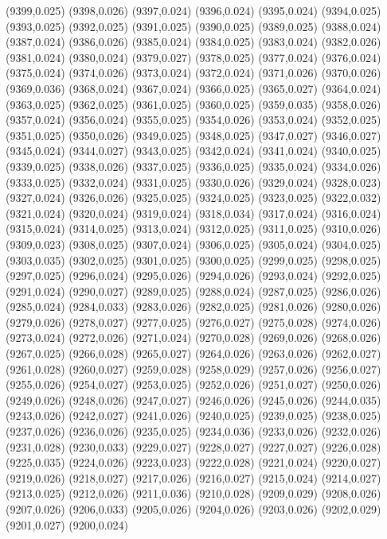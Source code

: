 (9399,0.025)
(9398,0.026)
(9397,0.024)
(9396,0.024)
(9395,0.024)
(9394,0.025)
(9393,0.025)
(9392,0.025)
(9391,0.025)
(9390,0.025)
(9389,0.025)
(9388,0.024)
(9387,0.024)
(9386,0.026)
(9385,0.024)
(9384,0.025)
(9383,0.024)
(9382,0.026)
(9381,0.024)
(9380,0.024)
(9379,0.027)
(9378,0.025)
(9377,0.024)
(9376,0.024)
(9375,0.024)
(9374,0.026)
(9373,0.024)
(9372,0.024)
(9371,0.026)
(9370,0.026)
(9369,0.036)
(9368,0.024)
(9367,0.024)
(9366,0.025)
(9365,0.027)
(9364,0.024)
(9363,0.025)
(9362,0.025)
(9361,0.025)
(9360,0.025)
(9359,0.035)
(9358,0.026)
(9357,0.024)
(9356,0.024)
(9355,0.025)
(9354,0.026)
(9353,0.024)
(9352,0.025)
(9351,0.025)
(9350,0.026)
(9349,0.025)
(9348,0.025)
(9347,0.027)
(9346,0.027)
(9345,0.024)
(9344,0.027)
(9343,0.025)
(9342,0.024)
(9341,0.024)
(9340,0.025)
(9339,0.025)
(9338,0.026)
(9337,0.025)
(9336,0.025)
(9335,0.024)
(9334,0.026)
(9333,0.025)
(9332,0.024)
(9331,0.025)
(9330,0.026)
(9329,0.024)
(9328,0.023)
(9327,0.024)
(9326,0.026)
(9325,0.025)
(9324,0.025)
(9323,0.025)
(9322,0.032)
(9321,0.024)
(9320,0.024)
(9319,0.024)
(9318,0.034)
(9317,0.024)
(9316,0.024)
(9315,0.024)
(9314,0.025)
(9313,0.024)
(9312,0.025)
(9311,0.025)
(9310,0.026)
(9309,0.023)
(9308,0.025)
(9307,0.024)
(9306,0.025)
(9305,0.024)
(9304,0.025)
(9303,0.035)
(9302,0.025)
(9301,0.025)
(9300,0.025)
(9299,0.025)
(9298,0.025)
(9297,0.025)
(9296,0.024)
(9295,0.026)
(9294,0.026)
(9293,0.024)
(9292,0.025)
(9291,0.024)
(9290,0.027)
(9289,0.025)
(9288,0.024)
(9287,0.025)
(9286,0.026)
(9285,0.024)
(9284,0.033)
(9283,0.026)
(9282,0.025)
(9281,0.026)
(9280,0.026)
(9279,0.026)
(9278,0.027)
(9277,0.025)
(9276,0.027)
(9275,0.028)
(9274,0.026)
(9273,0.024)
(9272,0.026)
(9271,0.024)
(9270,0.028)
(9269,0.026)
(9268,0.026)
(9267,0.025)
(9266,0.028)
(9265,0.027)
(9264,0.026)
(9263,0.026)
(9262,0.027)
(9261,0.028)
(9260,0.027)
(9259,0.028)
(9258,0.029)
(9257,0.026)
(9256,0.027)
(9255,0.026)
(9254,0.027)
(9253,0.025)
(9252,0.026)
(9251,0.027)
(9250,0.026)
(9249,0.026)
(9248,0.026)
(9247,0.027)
(9246,0.026)
(9245,0.026)
(9244,0.035)
(9243,0.026)
(9242,0.027)
(9241,0.026)
(9240,0.025)
(9239,0.025)
(9238,0.025)
(9237,0.026)
(9236,0.026)
(9235,0.025)
(9234,0.036)
(9233,0.026)
(9232,0.026)
(9231,0.028)
(9230,0.033)
(9229,0.027)
(9228,0.027)
(9227,0.027)
(9226,0.028)
(9225,0.035)
(9224,0.026)
(9223,0.023)
(9222,0.028)
(9221,0.024)
(9220,0.027)
(9219,0.026)
(9218,0.027)
(9217,0.026)
(9216,0.027)
(9215,0.024)
(9214,0.027)
(9213,0.025)
(9212,0.026)
(9211,0.036)
(9210,0.028)
(9209,0.029)
(9208,0.026)
(9207,0.026)
(9206,0.033)
(9205,0.026)
(9204,0.026)
(9203,0.026)
(9202,0.029)
(9201,0.027)
(9200,0.024)
